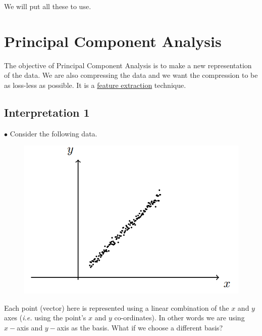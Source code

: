 \documentclass[11pt, a4paper]{article}
\begin{document}
We will put all these to use.



\section{Principal Component Analysis}

The objective of Principal Component Analysis is to make a new representation of the data. We are also compressing the data and we want the compression to be as loss-less as possible. It is a \underline{feature extraction} technique.

\subsection{Interpretation 1}

$\bullet$ Consider the following data.

\begin{figure}[!htbp]

\centering

\includegraphics[scale=0.5]{image_7.png}

\end{figure}

Each point (vector) here is represented using a linear combination of the $x$ and $y$ axes (\textit{i.e.} using the point’s $x$ and $y$ co-ordinates). In other words we are using $x-$axis and $y-$axis as the basis. What if we choose a different basis? \\

\hspace{0.3cm}
\end{document}
